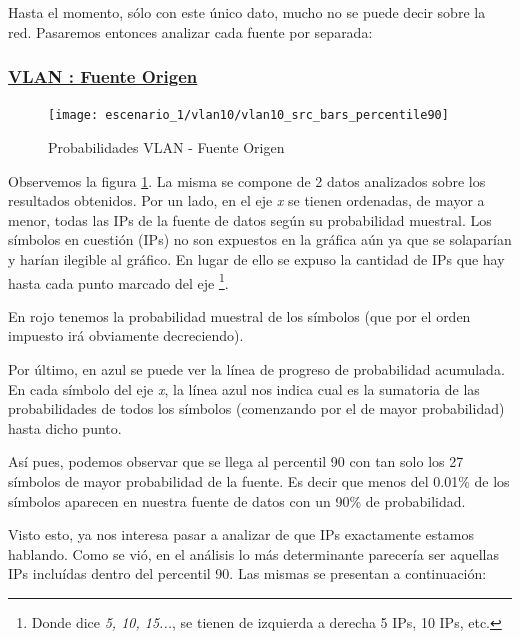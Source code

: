     \par Hasta el momento, s\'olo con este \'unico dato, mucho no se puede decir sobre la red.
    Pasaremos entonces analizar cada fuente por separada:


    \subsubsection*{\underline{VLAN : Fuente Origen}}\label{subsubsec:vlan10_src}

    \begin{figure}[!ht]
        \centering
        \texttt{[image: escenario\_1/vlan10/vlan10\_src\_bars\_percentile90]}
        \caption{Probabilidades VLAN  - Fuente Origen}
        \label{fig:vlan10_src_prob_per90}
    \end{figure}

    \par Observemos la figura \ref{fig:vlan10_src_prob_per90}. La misma se compone de 2
    datos analizados sobre los resultados obtenidos. Por 
    un lado, en el eje \textit{x} se tienen ordenadas, de mayor a menor, todas las IPs de la
    fuente de datos seg\'un su probabilidad muestral. Los s\'imbolos en cuesti\'on (IPs) no
    son expuestos en la gr\'afica a\'un ya que se solapar\'ian y har\'ian ilegible al gr\'afico.
    En lugar de ello se expuso la cantidad de IPs que hay hasta cada punto marcado del eje%
    \footnote{Donde dice \textit{5, 10, 15...}, se tienen de izquierda a derecha 5 IPs, 10
    IPs, etc.}. 

    \par En rojo tenemos la probabilidad muestral de los s\'imbolos (que por el orden impuesto
    ir\'a obviamente decreciendo).

    \par Por \'ultimo, en azul se puede ver la l\'inea de progreso de probabilidad acumulada.
    En cada s\'imbolo del eje \textit{x}, la l\'inea azul nos indica cual es la sumatoria de
    las probabilidades de todos los s\'imbolos (comenzando por el de mayor probabilidad) hasta
    dicho punto.\\

    \par As\'i pues, podemos observar que se llega al percentil 90 con tan solo los 27 s\'imbolos
    de mayor probabilidad de la fuente. Es decir que menos del 0.01\% de los s\'imbolos aparecen
    en nuestra fuente de datos con un 90\% de probabilidad.

    \par Visto esto, ya nos interesa pasar a analizar de que IPs exactamente estamos hablando.
    Como se vi\'o, en el an\'alisis lo m\'as determinante parecer\'ia ser aquellas IPs inclu\'idas
    dentro del percentil 90. Las mismas se presentan a continuaci\'on:

